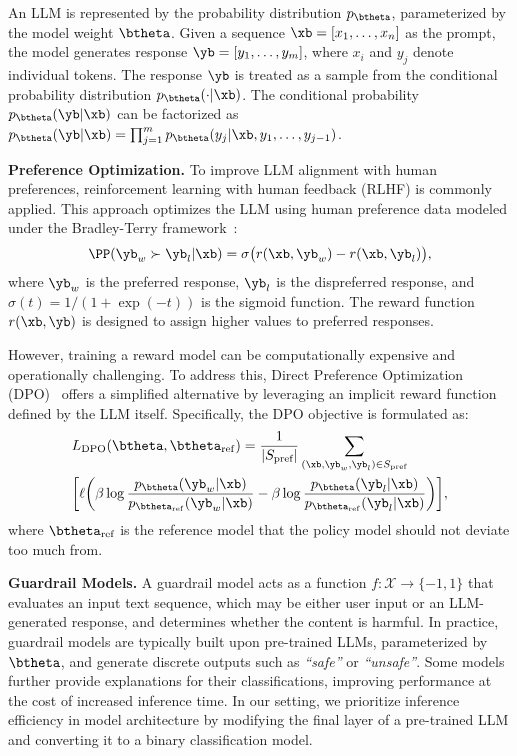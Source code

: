 An LLM is represented by the probability distribution $p_{\btheta}$, parameterized by the model weight $\btheta$. Given a sequence $\xb = [x_1, \ldots, x_n]$ as the prompt, the model generates response $\yb = [y_1, \ldots, y_m]$, where $x_i$ and $y_j$ denote individual tokens. The response $\yb$ is treated as a sample from the conditional probability distribution $p_{\btheta}(\cdot|\xb)$.
The conditional probability $p_{\btheta}(\yb|\xb)$ can be factorized as $p_{\btheta}(\yb|\xb) = \prod_{j=1}^{m} p_{\btheta}(y_{j} | \xb, y_1, \ldots, y_{j-1})$.

\textbf{Preference Optimization.} To improve LLM alignment with human preferences, reinforcement learning with human feedback (RLHF) is commonly applied. This approach optimizes the LLM using human preference data modeled under the Bradley-Terry framework~\citep{dong2024rlhf,shao2024deepseekmath,ahmadian2024back}:
\begin{align*} \PP(\yb_w \succ \yb_l | \xb) = \sigma\big(r(\xb, \yb_w) - r(\xb, \yb_l)\big), \end{align*}
where $\yb_w$ is the preferred response, $\yb_l$ is the dispreferred response, and $\sigma(t) = 1 / (1 + \exp(-t))$ is the sigmoid function. The reward function $r(\xb, \yb)$ is designed to assign higher values to preferred responses.

However, training a reward model can be computationally expensive and operationally challenging. To address this, Direct Preference Optimization (DPO)~\citep{rafailov2023direct} offers a simplified alternative by leveraging an implicit reward function defined by the LLM itself. Specifically, the DPO objective is formulated as:
\begin{align*} 
&L_{\mathrm{DPO}}(\btheta, \btheta_{\mathrm{ref}}) = \frac{1}{|S_{\text{pref}}|} \sum_{(\xb, \yb_w, \yb_l) \in S_{\text{pref}}} \\
& \bigg[\ell\bigg(\beta \log \frac{p_{\btheta}(\yb_w | \xb)}{p_{\btheta_{\mathrm{ref}}}(\yb_w | \xb)} - \beta \log \frac{p_{\btheta}(\yb_l | \xb)}{p_{\btheta_{\mathrm{ref}}}(\yb_l | \xb)}\bigg)\bigg], 
\end{align*}
where $\btheta_{\mathrm{ref}}$ is the reference model that the policy model should not deviate too much from.

\textbf{Guardrail Models.} A guardrail model acts as a function $f: \mathcal{X} \rightarrow \{-1,1\}$ that evaluates an input text sequence, which may be either user input or an LLM-generated response, and determines whether the content is harmful. In practice, guardrail models are typically built upon pre-trained LLMs, parameterized by $\btheta$, and generate discrete outputs such as \textit{``safe''} or \textit{``unsafe''}. Some models further provide explanations for their classifications, improving performance at the cost of increased inference time. In our setting, we prioritize inference efficiency in model architecture by modifying the final layer of a pre-trained LLM and converting it to a binary classification model.

